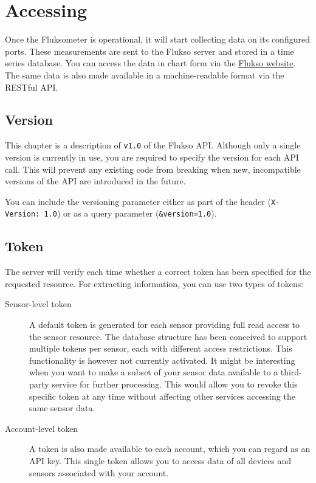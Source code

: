 \chapter{Accessing}

Once the Fluksometer is operational, it will start collecting data on its configured ports. These measurements are sent to the Flukso server and stored in a time series database. You can access the data in chart form via the \href{http://www.flukso.net}{Flukso website}. The same data is also made available in a machine-readable format via the RESTful API.

\section{Version}
This chapter is a description of \texttt{v1.0} of the Flukso API. Although only a single version is currently in use, you are required to specify the version for each API call. This will prevent any existing code from breaking when new, incompatible versions of the API are introduced in the future.

You can include the versioning parameter either as part of the header (\texttt{X-Version: 1.0}) or as a query parameter (\texttt{\&version=1.0}).

\section{Token}
The server will verify each time whether a correct token has been specified for the requested resource. For extracting information, you can use two types of tokens:
\begin{description}

\item[Sensor-level token] A default token is generated for each sensor providing full read access to the sensor resource. The database structure has been conceived to support multiple tokens per sensor, each with different access restrictions. This functionality is however not currently activated. It might be interesting when you want to make a subset of your sensor data available to a third-party service for further processing. This would allow you to revoke this specific token at any time without affecting other services accessing the same sensor data.

\item[Account-level token] A token is also made available to each account, which you can regard as an API key. This single token allows you to access data of all devices and sensors associated with your account.

\end{description}

